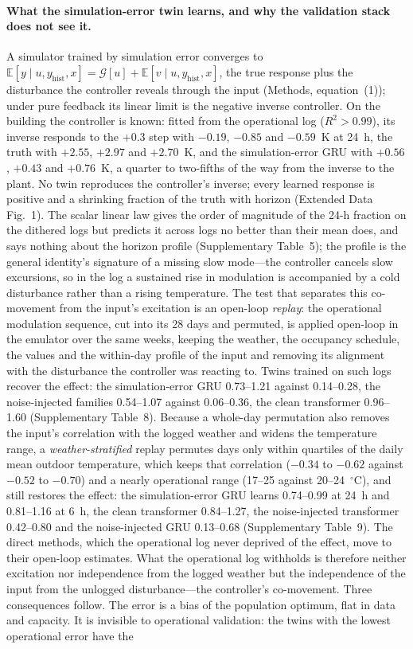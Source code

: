 \documentclass[11pt]{article}
\newcommand{\E}{\mathbb{E}}
\begin{document}
\paragraph{What the simulation-error twin learns, and why the validation stack does not see it.} A simulator trained by simulation error converges to $\E[y\mid u,y_{\mathrm{hist}},x]=\mathcal G[u]+\E[v\mid u,y_{\mathrm{hist}},x]$, the true response plus the disturbance the controller reveals through the input (Methods, equation~(1)); under pure feedback its linear limit is the negative inverse controller. On the building the controller is known: fitted from the operational log ($R^2>0.99$), its inverse responds to the $+0.3$ step with $-0.19$, $-0.85$ and $-0.59$~K at 24~h, the truth with $+2.55$, $+2.97$ and $+2.70$~K, and the simulation-error GRU with $+0.56$, $+0.43$ and $+0.76$~K, a quarter to two-fifths of the way from the inverse to the plant. No twin reproduces the controller's inverse; every learned response is positive and a shrinking fraction of the truth with horizon (Extended Data Fig.~1). The scalar linear law gives the order of magnitude of the 24-h fraction on the dithered logs but predicts it across logs no better than their mean does, and says nothing about the horizon profile (Supplementary Table~5); the profile is the general identity's signature of a missing slow mode---the controller cancels slow excursions, so in the log a sustained rise in modulation is accompanied by a cold disturbance rather than a rising temperature. The test that separates this co-movement from the input's excitation is an open-loop \emph{replay}: the operational modulation sequence, cut into its 28 days and permuted, is applied open-loop in the emulator over the same weeks, keeping the weather, the occupancy schedule, the values and the within-day profile of the input and removing its alignment with the disturbance the controller was reacting to. Twins trained on such logs recover the effect: the simulation-error GRU 0.73--1.21 against 0.14--0.28, the noise-injected families 0.54--1.07 against 0.06--0.36, the clean transformer 0.96--1.60 (Supplementary Table~8). Because a whole-day permutation also removes the input's correlation with the logged weather and widens the temperature range, a \emph{weather-stratified} replay permutes days only within quartiles of the daily mean outdoor temperature, which keeps that correlation ($-0.34$ to $-0.62$ against $-0.52$ to $-0.70$) and a nearly operational range (17--25 against 20--24~$^\circ$C), and still restores the effect: the simulation-error GRU learns 0.74--0.99 at 24~h and 0.81--1.16 at 6~h, the clean transformer 0.84--1.27, the noise-injected transformer 0.42--0.80 and the noise-injected GRU 0.13--0.68 (Supplementary Table~9). The direct methods, which the operational log never deprived of the effect, move to their open-loop estimates. What the operational log withholds is therefore neither excitation nor independence from the logged weather but the independence of the input from the unlogged disturbance---the controller's co-movement. Three consequences follow. The error is a bias of the population optimum, flat in data and capacity. It is invisible to operational validation: the twins with the lowest operational error have the 
\end{document}
